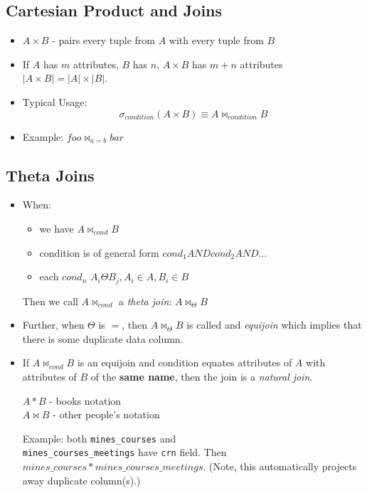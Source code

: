 \documentclass{../cheatsheet}
\begin{document}
\begin{multicols*}{2}
    \subsection{Cartesian Product and Joins}
    \begin{itemize}
        \item $A \times B$ - pairs every tuple from $A$ with every tuple from $B$
        \item If $A$ has $m$ attributes, $B$ has $n$, $A \times B$ has $m + n$
            attributes $|A \times B| = |A| \times |B|$.
        \item Typical Usage:
            \[\sigma_{condition}(A \times B) \equiv A \bowtie_{condition} B\]
        \item Example: \(foo \bowtie_{a = b} bar\)
    \end{itemize}

    \subsection{Theta Joins}
    \begin{itemize}
        \item When:
            \begin{itemize}
                \item we have $A \bowtie_{cond} B$
                \item condition is of general form $cond_1 AND cond_2 AND \dots$
                \item each $cond_n$ $A_i \Theta B_j, A_i \in A, B_i \in B$
            \end{itemize}
            Then we call $A \bowtie_{cond}$ a \textit{theta join}: $A
            \bowtie_{\Theta} B$

        \item Further, when $\Theta$ is $=$, then $A \bowtie_\Theta B$ is called
            and \textit{equijoin} which implies that there is some duplicate
            data column.

        \item If $A \bowtie_{cond} B$ is an equijoin and condition equates
            attributes of $A$ with attributes of $B$ of the \textbf{same name},
            then the join is a \textit{natural join}.

            $A * B$ - books notation \\
            $A \bowtie B$ - other people's notation

            Example: both \texttt{mines\_courses} and\\
            \texttt{mines\_courses\_meetings} have \texttt{crn} field. Then
            $mines\_courses * mines\_courses\_meetings$. (Note, this
            automatically projects away duplicate column(s).)
    \end{itemize}


\end{multicols*}
\end{document}
